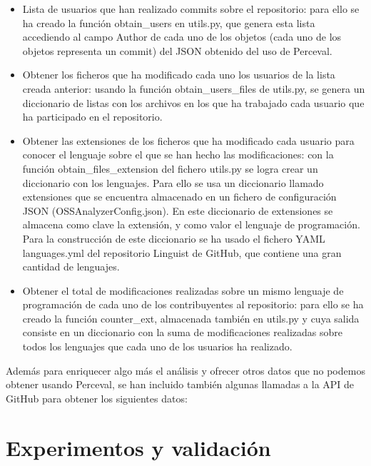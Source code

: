 \documentclass[a4paper, 12pt]{book}
\begin{document}
\begin{itemize}
  \item Lista de usuarios que han realizado commits sobre el repositorio: para ello se ha creado la función obtain\_users en utils.py, que genera esta lista accediendo al campo Author de cada uno de los objetos (cada uno de los objetos representa un commit) del JSON obtenido del uso de Perceval.
  \item Obtener los ficheros que ha modificado cada uno los usuarios de la lista creada anterior: usando la función obtain\_users\_files de utils.py, se genera un diccionario de listas con los archivos en los que ha trabajado cada usuario que ha participado en el repositorio.
  \item Obtener las extensiones de los ficheros que ha modificado cada usuario para conocer el lenguaje sobre el que se han hecho las modificaciones: con la función obtain\_files\_extension del fichero utils.py se logra crear un diccionario con los lenguajes. Para ello se usa un diccionario llamado extensiones que se encuentra almacenado en un fichero de configuración JSON (OSSAnalyzerConfig.json). En este diccionario de extensiones se almacena como clave la extensión, y como valor el lenguaje de programación. Para la construcción de este diccionario se ha usado el fichero YAML languages.yml del repositorio Linguist de GitHub, que contiene una gran cantidad de lenguajes.
  \item Obtener el total de modificaciones realizadas sobre un mismo lenguaje de programación de cada uno de los contribuyentes al repositorio: para ello se ha creado la función counter\_ext, almacenada también en utils.py y cuya salida consiste en un diccionario con la suma de modificaciones realizadas sobre todos los lenguajes que cada uno de los usuarios ha realizado.
\end{itemize}

Además para enriquecer algo más el análisis y ofrecer otros datos que no podemos obtener usando Perceval, se han incluido también algunas llamadas a la API de GitHub para obtener los siguientes datos:







\cleardoublepage
\chapter{Experimentos y validación}
\label{chap:experimentos}
\end{document}
